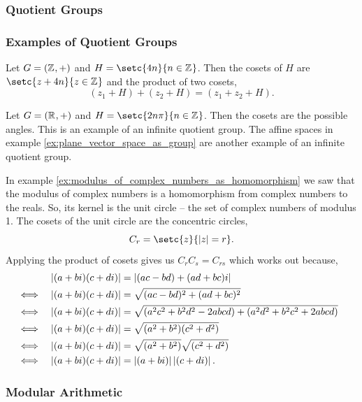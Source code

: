 \documentclass[MathsNotesBase.tex]{subfiles}
\begin{document}
{		\bigskip
		\subsubsection{Quotient Groups}\label{subsubsection:Quotient Groups}
	
		\subsubsection{Examples of Quotient Groups}
		\begin{exe}
			\item{Let ${ G = (\mathbb{Z}^{}, +) }$ and ${ H = \setc{4n}{n \in \Z{}} }$. Then the cosets of $H$ are ${ \setc{z + 4n}{z \in \Z{}} }$ and the product of two cosets,
				\[ (z_1 + H) + (z_2 + H) = (z_1 + z_2 + H). \]
			}
			\item{Let ${ G = (\mathbb{R}^{}, +) }$ and ${ H = \setc{2n\pi}{n \in \Z{}} }$. Then the cosets are the possible angles. This is an example of an infinite quotient group. The affine spaces in example \ref{ex:plane_vector_space_as_group} are another example of an infinite quotient group.}
			\medskip
			\item{In example \ref{ex:modulus_of_complex_numbers_as_homomorphism} we saw that the modulus of complex numbers is a homomorphism from complex numbers to the reals. So, its kernel is the unit circle -- the set of complex numbers of modulus 1. The cosets of the unit circle are the concentric circles,
				\[ C_r = \setc{z}{ \abs{z} = r }. \]
			Applying the product of cosets gives us ${ C_rC_s = C_{rs} }$ which works out because,
			\begin{align*}
			&& \left\lvert(a + bi)(c + di)\right\rvert &= \left\lvert(ac - bd) + (ad + bc)i\right\rvert \\
			&\iff & \left\lvert(a + bi)(c + di)\right\rvert &= \sqrt{(ac - bd)^2 + (ad + bc)^2} &\text{\scriptsize{}} \\
			&\iff & \left\lvert(a + bi)(c + di)\right\rvert &= \sqrt{(a^2c^2 + b^2d^2 - 2abcd) + (a^2d^2 + b^2c^2 + 2abcd)} \\
			&\iff & \left\lvert(a + bi)(c + di)\right\rvert &= \sqrt{(a^2 + b^2)(c^2 + d^2)} \\
			&\iff & \left\lvert(a + bi)(c + di)\right\rvert &= \sqrt{(a^2 + b^2)}\sqrt{(c^2 + d^2)} \\
			&\iff & \left\lvert(a + bi)(c + di)\right\rvert &= \left\lvert(a + bi)\right\rvert\left\lvert(c + di)\right\rvert. \\
			\end{align*}
			}
		\end{exe}
	
		
		\bigskip
		\subsubsection{Modular Arithmetic}
	}
	
\end{document}
